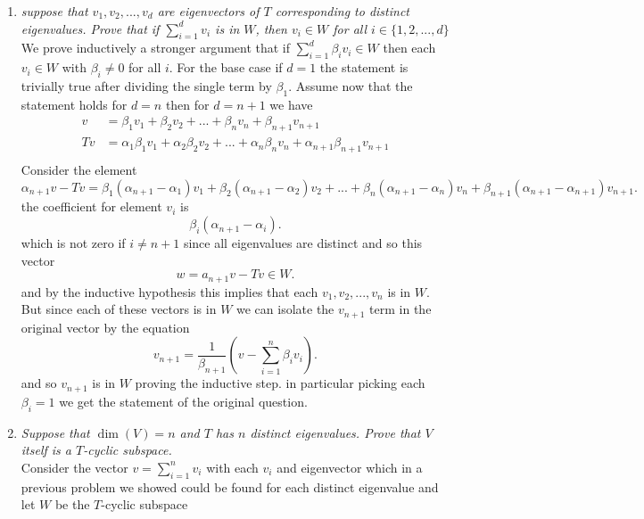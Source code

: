 \documentclass{article}
\begin{document}
    \begin{enumerate}
        \item\emph{ suppose that $v_1,v_2,...,v_d$ are eigenvectors of $T$ corresponding to distinct eigenvalues.
            Prove that if $\sum_{i=1}^{d}v_i$ is in $W$, then $v_i \in W$ for all $i \in \{1,2,...,d\}$ \\}
                We prove inductively a stronger argument that if $\sum_{i=1}^{d}\beta_iv_i \in W$ then each $v_i \in W$ with $\beta_i \ne 0$ for all $i$. For the base case if $d = 1$ the statement is trivially true after 
                dividing the single term by $\beta_1$.
                Assume now that the statement holds for $d = n$ then for $d = n+1$ we have
                \begin{align*}
                    v &= \beta_1v_1+\beta_2v_2+...+\beta_nv_n+\beta_{n+1}v_{n+1}\\
                    Tv &= \alpha_1\beta_1v_1 + \alpha_2\beta_2v_2 + ... +\alpha_n\beta_nv_n + \alpha_{n+1}\beta_{n+1}v_{n+1}\\
                \end{align*}
                Consider the element
                \[
                    \alpha_{n+1}v - Tv = \beta_1(\alpha_{n+1}-\alpha_1)v_1 + \beta_2(\alpha_{n+1}-\alpha_2)v_2 + ... + \beta_n(\alpha_{n+1}-\alpha_n)v_n + \beta_{n+1}(\alpha_{n+1}-\alpha_{n+1})v_{n+1}
                .\] 
                the coefficient for element $v_i$ is
                \[
                    \beta_i(\alpha_{n+1}-\alpha_i)
                .\] 
                which is not zero if $i \ne n+1$ since all eigenvalues are distinct and so this vector
                 \[
                     w = a_{n+1}v - Tv \in W
                .\] 
                and by the inductive hypothesis this implies that each $v_1,v_2,...,v_n$ is in $W$.
                But since each of these vectors is in  $W$ we can isolate the $v_{n+1}$ term in the original vector by the equation
                \[
                    v_{n+1} = \frac{1}{\beta_{n+1}}(v - \sum_{i=1}^{n}\beta_iv_i)
                .\] 
                and so  $v_{n+1}$ is in $W$ proving the inductive step. in particular picking each $\beta_i = 1$ we get the statement of the original
                question.
            \item \emph{
                    Suppose that $\dim(V) = n$ and  $T$ has $n$ distinct eigenvalues. Prove that
                    $V$ itself is a $T$-cyclic subspace. 
                }\\
                Consider the vector $v = \sum_{i=1}^{n}v_i$ with each $v_i$ and eigenvector which in a previous problem we showed could be found for each distinct eigenvalue and let $W$ be the $T$-cyclic subspace

\end{enumerate}
\end{document}
